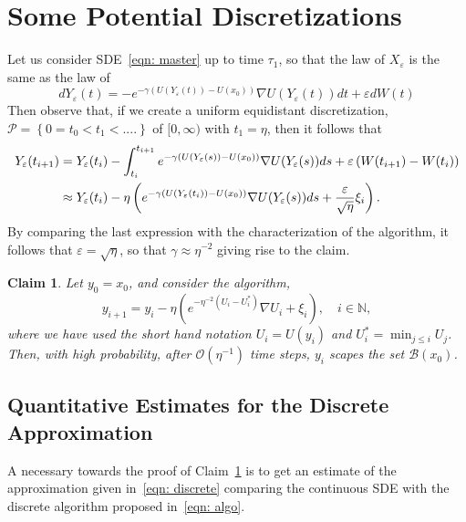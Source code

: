 \documentclass{amsproc}
\newtheorem{claim}[theorem]{Claim}
\newcommand{\eps}{\varepsilon}
\newcommand{\x}{X_\eps}
\newcommand{\y}{Y_\eps}
\begin{document}
\section{Some Potential Discretizations}
Let us consider SDE~\eqref{eqn: master} up to time $\tau_1$, so that the law of $\x$ is the same as the law of 
\[
d\y(t) = - e^{ - \gamma \left(  U(\y(t)) - U(x_0) \right )} \nabla U(\y(t)) dt + \eps dW(t)
\]
Then observe that, if we create a uniform equidistant discretization, $\mathcal{P}=\left\{ 0=t_0 < t_1 <.... \right \}$ of $[0,\infty)$ with $t_1 = \eta$, then it follows that 
\begin{align} \notag
\y(t_{i+1})  &= \y(t_i) - \int_{t_i}^{t_{i+1}}   e^{ - \gamma \left(  U(\y(s)) - U(x_0) \right )} \nabla U(\y(s))ds + \eps \left( W(t_{i+1}) - W(t_i) \right) \\
&\approx \y(t_i) - \eta \left(   e^{ - \gamma \left(  U(\y(t_i)) - U(x_0) \right )} \nabla U(\y(s))ds + \frac{\eps}{\sqrt{\eta}} \xi_i \right). \label{eqn: discrete}
\end{align}
By comparing the last expression with the characterization of the algorithm, it follows that $\eps = \sqrt{\eta}$, so that $\gamma \approx \eta^{-2}$ giving rise to the claim. 
\begin{claim}\label{claim: convergence}
Let $y_0 = x_0$, and consider the algorithm,  
\begin{equation} \label{eqn: algo}
y_{i+1} = y_i  - \eta \left( e^{ -\eta^{-2} \left( U_i - U^*_i  \right) } \nabla U_i + \xi_i \right), \quad i \in \mathbb{N},
\end{equation}
where we have used the short hand notation $U_i = U(y_i)$ and $U^*_i = \min_{ j \leq i } U_j $. Then, with high probability, after $\mathcal{O}(\eta^{-1})$ time steps, $y_i$ scapes the set $\mathcal{B}(x_0)$.
\end{claim}
\subsection{Quantitative Estimates for the Discrete Approximation}
A necessary towards the proof of Claim~\ref{claim: convergence} is to get an estimate of the approximation given in~\eqref{eqn: discrete} comparing the continuous SDE with the discrete algorithm proposed in~\eqref{eqn: algo}. 
\end{document}
